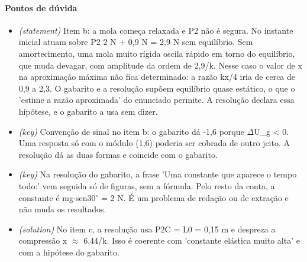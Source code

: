 \documentclass{article}%
\begin{document}
\paragraph{Pontos de dúvida}%
\begin{itemize}%
\item%
\textit{(statement)} Item b: a mola começa relaxada e P2 não é segura. No instante inicial atuam sobre P2 2 N + 0,9 N = 2,9 N sem equilíbrio. Sem amortecimento, uma mola muito rígida oscila rápido em torno do equilíbrio, que muda devagar, com amplitude da ordem de 2,9/k. Nesse caso o valor de x na aproximação máxima não fica determinado: a razão kx/4 iria de cerca de 0,9 a 2,3. O gabarito e a resolução supõem equilíbrio quase estático, o que o 'estime a razão aproximada' do enunciado permite. A resolução declara essa hipótese, e o gabarito a usa sem dizer.%
\item%
\textit{(key)} Convenção de sinal no item b: o gabarito dá -1,6 porque $\Delta$U\_g < 0. Uma resposta só com o módulo (1,6) poderia ser cobrada de outro jeito. A resolução dá as duas formas e coincide com o gabarito.%
\item%
\textit{(key)} Na resolução do gabarito, a frase 'Uma constante que aparece o tempo todo:' vem seguida só de figuras, sem a fórmula. Pelo resto da conta, a constante é mg$\cdot$sen30$^\circ$ = 2 N. É um problema de redação ou de extração e não muda os resultados.%
\item%
\textit{(solution)} No item c, a resolução usa P2C = L0 = 0,15 m e despreza a compressão x $\approx$ 6,44/k. Isso é coerente com 'constante elástica muito alta' e com a hipótese do gabarito.%
\end{itemize}%
\end{document}
